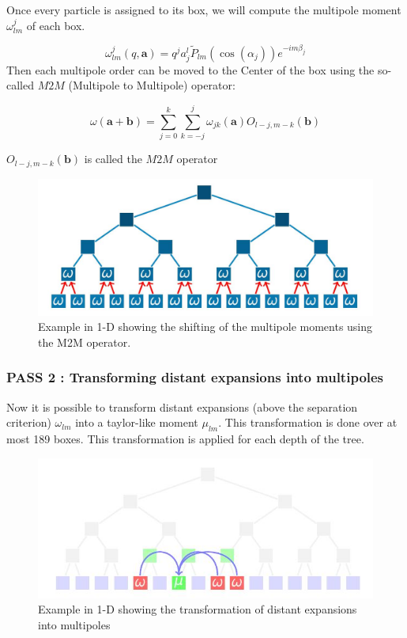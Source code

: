 \documentclass[12pt,twoside,a4paper]{report}
\begin{document}
    Once every particle is assigned to its box, we will compute the multipole moment $\omega_{lm}^j$ of each box.
    
    \begin{equation}
    \omega_{lm}^{j}(q,\textbf{a}) = q^j a_j^l \widetilde{P}_{lm}(\cos(\alpha_j))e^{-im\beta_j}
    \end{equation}
%
Then each multipole order can be moved to the Center of the box using the so-called $M2M$ (Multipole to Multipole) operator:    
    
    \begin{equation}
    \omega(\textbf{a} + \textbf{b}) = \sum\limits_{j=0}^{k} \sum\limits_{k=-j}^{j} \omega_{jk}(\textbf{a}) O_{l-j,m-k}(\textbf{b})
    \end{equation}

   $O_{l-j,m-k}(\textbf{b})$ is called the $M2M$ operator
   
   \begin{figure}[H]
   \includegraphics[scale=0.4]{ShiftMultipole}
    \centering 
    \caption{Example in 1-D showing the shifting of the multipole moments using the M2M operator. }
    \label{fig:multipole}
   \end{figure}
   
   
   	\subsubsection{PASS 2 : Transforming distant expansions into multipoles}
   	
   	Now it is possible to transform distant expansions (above the separation criterion) $\omega_{lm}$ into a taylor-like moment $\mu_{lm}$. This transformation is done over at most 189 boxes. This transformation is applied for each depth of the tree.  
   	
   	
 \begin{figure}[H]
 	\label{fig:M2L}
   \includegraphics[scale=0.8]{transformExpansions1}
    \centering 
    \caption{Example in 1-D showing the transformation of distant expansions into multipoles}
    
   \end{figure}
   
\end{document}
